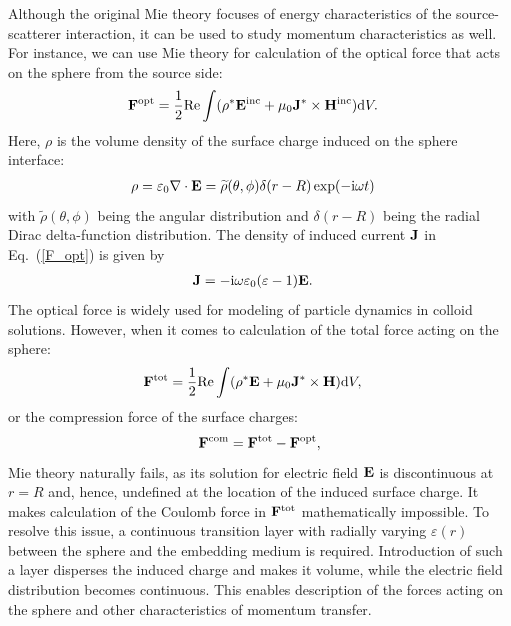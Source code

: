 \documentclass[aps,prb,reprint]{revtex4-2}
\renewcommand{\vec}[1]{{\bf #1}}
\renewcommand{\d}{{\rm d}}
\renewcommand{\i}{{\rm i}}
\begin{document}
Although the original Mie theory focuses of energy characteristics of the source-scatterer interaction, it can be used to study momentum characteristics as well.
For instance, we can use Mie theory for calculation of the optical force that acts on the sphere from the source side:
\begin{eqnarray}
	&\displaystyle 
	\vec F^{\rm opt}=\frac{1}{2}{\rm Re}\int (\rho^*\vec E^{\rm inc}+\mu_0\vec J^*\times\vec H^{\rm inc})\d V.\label{F_opt}
\end{eqnarray} 
Here, $\rho$ is the volume density of the surface charge induced on the sphere interface:
\begin{eqnarray}
	&\displaystyle 
	\rho=\varepsilon_0\nabla\cdot\vec E=\widetilde\rho(\theta,\phi)\delta(r-R)\exp(-\i\omega t)
\end{eqnarray} 
with $\widetilde\rho(\theta,\phi)$ being the angular distribution and $\delta(r-R)$ being the radial Dirac delta-function distribution. The density of induced current $\vec J$ in Eq.~(\ref{F_opt}) is given by  
\begin{eqnarray}
	&\displaystyle
	\vec J=-\i\omega\varepsilon_0(\varepsilon-1)\vec E.
\end{eqnarray} 
The optical force is widely used for modeling of particle dynamics in colloid solutions. However, when it comes to calculation of the total force acting on the sphere: 
\begin{eqnarray}
	&\displaystyle 
	\vec F^{\rm tot}=\frac{1}{2}{\rm Re}\int (\rho^*\vec E+\mu_0\vec J^*\times\vec H)\d V,
\end{eqnarray} 
or the compression force of the surface charges:
\begin{eqnarray}
	\vec F^{\rm com}=\vec F^{\rm tot}-\vec F^{\rm opt},
\end{eqnarray} 
Mie theory naturally fails, as its solution for electric field $\vec E$ is discontinuous at $r=R$ and, hence, undefined at the location of the induced surface charge. 
It makes calculation of the Coulomb force in $\vec F^{\rm tot}$ mathematically impossible.
To resolve this issue, a continuous transition layer with radially varying $\varepsilon(r)$ between the sphere and the embedding medium is required. 
Introduction of such a layer disperses the induced charge and makes it volume, while the electric field distribution becomes continuous. 
This enables description of the forces acting on the sphere and other characteristics of momentum transfer.  
\end{document}
